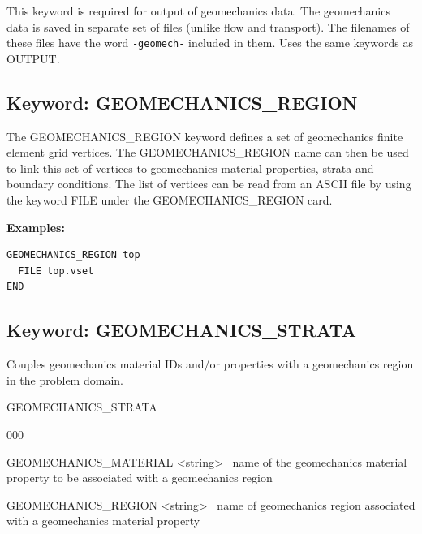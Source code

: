  This keyword is required for output of geomechanics data. The geomechanics data is saved in separate set of files (unlike flow and transport). The filenames of these files have the word \texttt{-geomech-} included in them.  Uses the same keywords as OUTPUT. 


\newpage
\protect\hypertarget{target_geomech_region}{}
 
\subsection{Keyword: GEOMECHANICS\_REGION}

\hfill\hyperlink{target_key}{\return}

 The GEOMECHANICS\_REGION keyword defines a set of geomechanics finite element grid vertices.
The GEOMECHANICS\_REGION name can then be used to link this set of vertices to geomechanics  material properties, strata and boundary conditions. 
The list of vertices can be read from an ASCII file by using the keyword FILE under the GEOMECHANICS\_REGION card.

\begin{mdframed}

{\noindent\bf
Examples:}

\footnotesize

\begin{verbatim}
GEOMECHANICS_REGION top 
  FILE top.vset 
END
\end{verbatim}
\normalsize
\end{mdframed}

\hyperlink{target_key}{\return}


\newpage
\protect\hypertarget{target_geomech_strata}{}
 
\subsection{Keyword: GEOMECHANICS\_STRATA}

\hfill\hyperlink{target_key}{\return}

Couples geomechanics material IDs and/or properties with a geomechanics region in the problem domain.

\begin{deflist}{00}
\item[GEOMECHANICS\_STRATA] ~
\begin{deflist}{000}
\item[GEOMECHANICS\_MATERIAL] <string> \ name of the geomechanics material property to be associated with a geomechanics region
\item[GEOMECHANICS\_REGION] <string> \ name of geomechanics region associated with a geomechanics material property
\end{deflist}
\item[\keyend]
\end{deflist}

